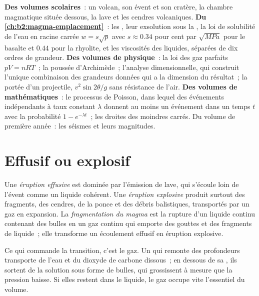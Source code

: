 \begin{recall}
\textbf{Des volumes scolaires}~: un volcan, son évent et son cratère, la chambre
magmatique située dessous, la lave et les cendres volcaniques. \textbf{Du
\cref{ch:b2:magma-emplacement}}~: les , leur exsolution sous la
, la loi de solubilité de l'eau en racine carrée $w = s\sqrt p$ avec
$s \approx 0.34$ pour cent par $\sqrt{\unit{MPa}}$ pour le basalte et $0.44$ pour
la rhyolite, et les viscosités des liquides, séparées de dix ordres de grandeur.
\textbf{Des volumes de physique}~: la loi des gaz parfaits $pV = nRT$~; la poussée
d'Archimède~; l'analyse dimensionnelle, qui construit l'unique combinaison des grandeurs données
qui a la dimension du résultat~; la portée d'un projectile, $v^2\sin 2\theta/g$
sans résistance de l'air. \textbf{Des volumes de mathématiques}~: le processus de Poisson,
dans lequel des événements indépendants à taux constant $\lambda$ donnent au moins un événement
dans un temps $t$ avec la probabilité $1 - e^{-\lambda t}$~; les droites des moindres carrés.
Du volume de première année~: les séismes et leurs magnitudes.
\end{recall}

\section{Effusif ou explosif}

\begin{definition}\label{def:b2:eruptive-styles:regimes}
Une \emph{éruption effusive} est dominée par
l'émission de lave, qui s'écoule loin de l'évent comme un liquide cohérent. Une
\emph{éruption explosive} produit surtout des fragments,
des cendres, de la ponce et des débris balistiques, transportés par un gaz en expansion. La
\emph{fragmentation du magma} est la rupture d'un liquide continu
contenant des bulles en un gaz continu qui emporte des gouttes et des fragments de liquide~;
elle transforme un écoulement effusif en éruption explosive.
\end{definition}

Ce qui commande la transition, c'est le gaz. Un  qui remonte des profondeurs transporte
de l'eau et du dioxyde de carbone dissous~; en dessous de sa , ils
sortent de la solution sous forme de bulles, qui grossissent à mesure que la pression baisse.
Si elles restent dans le liquide, le gaz occupe vite l'essentiel du volume.

